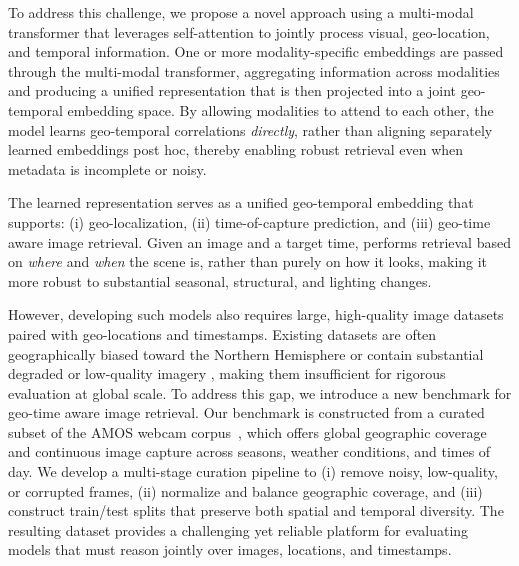 To address this challenge, we propose a novel approach using a multi-modal transformer that leverages self-attention to jointly process visual, geo-location, and temporal information. One or more modality-specific embeddings are passed through the multi-modal transformer, aggregating information across modalities and producing a unified representation that is then projected into a joint geo-temporal embedding space. By allowing modalities to attend to each other, the model learns geo-temporal correlations \emph{directly}, rather than aligning separately learned embeddings post hoc, thereby enabling robust retrieval even when metadata is incomplete or noisy.

The learned representation serves as a unified geo-temporal embedding that supports: (i) geo-localization, (ii) time-of-capture prediction, and (iii) geo-time aware image retrieval. Given an image and a target time, \tiger performs retrieval based on \emph{where} and \emph{when} the scene is, rather than purely on how it looks, making it more robust to substantial seasonal, structural, and lighting changes.

However, developing such models also requires large, high-quality image datasets paired with geo-locations and timestamps. Existing datasets are often geographically biased toward the Northern Hemisphere \cite{mihail2016sky} or contain substantial degraded or low-quality imagery \cite{jacobs07amos, jacobs09webcamgis}, making them insufficient for rigorous evaluation at global scale. To address this gap, we introduce a new benchmark for geo-time aware image retrieval. Our benchmark is constructed from a curated subset of the AMOS webcam corpus~\cite{jacobs09webcamgis, jacobs07amos}, which offers global geographic coverage and continuous image capture across seasons, weather conditions, and times of day. We develop a multi-stage curation pipeline to (i) remove noisy, low-quality, or corrupted frames, (ii) normalize and balance geographic coverage, and (iii) construct train/test splits that preserve both spatial and temporal diversity. The resulting dataset provides a challenging yet reliable platform for evaluating models that must reason jointly over images, locations, and timestamps.


